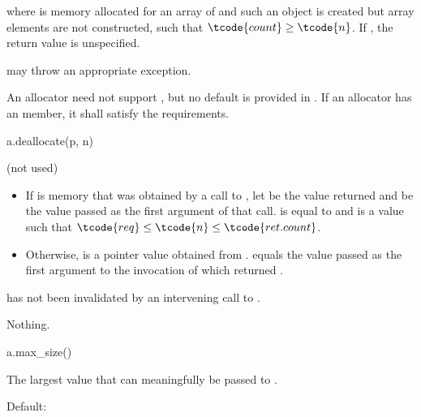 \begin{itemdescr}
\pnum
\result
{}

\pnum
\returns
{}
where  is memory allocated for an array of  
and such an object is created but array elements are not constructed,
such that $\tcode{count} \geq \tcode{n}$.
If , the return value is unspecified.

\pnum
\throws
{} may throw an appropriate exception.

\pnum
\remarks
An allocator need not support ,
but no default is provided in .
If an allocator has an  member,
it shall satisfy the requirements.
\end{itemdescr}

\begin{itemdecl}
a.deallocate(p, n)
\end{itemdecl}

\begin{itemdescr}
\pnum
\result
(not used)

\pnum
\expects
\begin{itemize}
\item
If  is memory
that was obtained by a call to ,
let  be the value returned and
 be the value passed as the first argument of that call.
 is equal to  and
 is a value such that
$\tcode{req} \leq \tcode{n} \leq \tcode{ret.count}$.
\item
Otherwise,  is a pointer value obtained from .
 equals the value passed as the first argument
to the invocation of  which returned .
\end{itemize}
 has not been invalidated by
an intervening call to .

\pnum
\throws
Nothing.
\end{itemdescr}

\begin{itemdecl}
a.max_size()
\end{itemdecl}

\begin{itemdescr}
\pnum
\result
{}

\pnum
\returns
The largest value  that can meaningfully be passed to .

\pnum
\remarks
Default:
\end{itemdescr}

